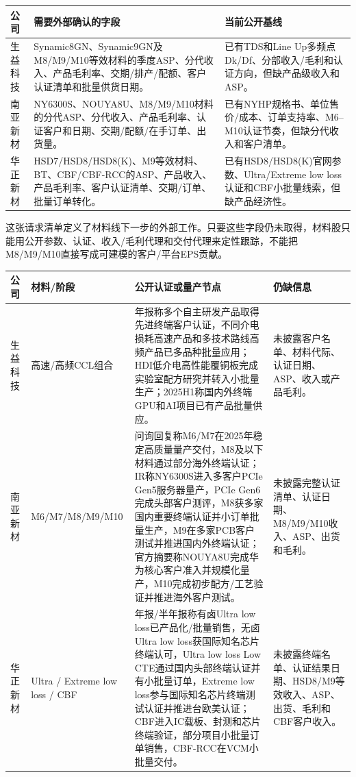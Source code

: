 \begin{exhibitbox}[图表3-16：材料线外部数据请求清单]
\scriptsize
\begin{tabularx}{\textwidth}{L{1.8cm}X X}
\toprule
\textbf{公司} & \textbf{需要外部确认的字段} & \textbf{当前公开基线} \\
\midrule
生益科技 & Synamic8GN、Synamic9GN及M8/M9/M10等效材料的季度ASP、分代收入、产品毛利率、交期/排产/配额、客户认证清单和批量供货日期。 & 已有TDS和Line Up多频点Dk/Df、分部收入/毛利和认证方向，但缺产品级收入和ASP。 \\
南亚新材 & NY6300S、NOUYA8U、M8/M9/M10材料的分代ASP、分代收入、产品毛利率、认证客户和日期、交期/配额/在手订单、出货量。 & 已有NYHP规格书、单位售价/成本、订单支持率、M6--M10认证节奏，但缺分代收入和客户清单。 \\
华正新材 & HSD7/HSD8/HSD8(K)、M9等效材料、BT、CBF/CBF-RCC的ASP、产品收入、产品毛利率、客户认证清单、交期/订单、批量订单转化。 & 已有HSD8/HSD8(K)官网参数、Ultra/Extreme low loss认证和CBF小批量线索，但缺产品经济性。 \\
\bottomrule
\end{tabularx}
\end{exhibitbox}

这张请求清单定义了材料线下一步的外部工作。只要这些字段仍未取得，材料股只能用公开参数、认证、收入/毛利代理和交付代理来定性跟踪，不能把M8/M9/M10直接写成可建模的客户/平台EPS贡献。

\begin{exhibitbox}[图表3-17：材料客户认证时间线]
\scriptsize
\begin{tabularx}{\textwidth}{L{1.7cm}L{2.0cm}X X}
\toprule
\textbf{公司} & \textbf{材料/阶段} & \textbf{公开认证或量产节点} & \textbf{仍缺信息} \\
\midrule
生益科技 & 高速/高频CCL组合 & 年报称多个自主研发产品取得先进终端客户认证，不同介电损耗高速产品和多技术路线高频产品已多品种批量应用；HDI低介电高性能覆铜板完成实验室配方研究并转入小批量生产；2025H1称国内外终端GPU和AI项目已有产品批量供应。 & 未披露客户名单、材料代际、认证日期、ASP、收入或产品毛利。 \\
南亚新材 & M6/M7/M8/M9/M10 & 问询回复称M6/M7在2025年稳定高质量量产交付，M8及以下材料通过部分海外终端认证；IR称NY6300S进入多客户PCIe Gen5服务器量产，PCIe Gen6完成头部客户测评，M8获多家国内重要终端认证并小订单批量生产，M9在多家PCB客户测试并推进国内外终端认证；官方摘要称NOUYA8U完成华为核心客户准入并规模化量产，M10完成初步配方/工艺验证并推进海外客户测试。 & 未披露完整认证清单、认证日期、M8/M9/M10收入、ASP、出货和毛利。 \\
华正新材 & Ultra / Extreme low loss / CBF & 年报/半年报称有卤Ultra low loss已产品化/批量销售，无卤Ultra low loss获国际知名芯片终端认可，Ultra low loss Low CTE通过国内头部终端认证并有小批量订单，Extreme low loss参与国际知名芯片终端测试认证并推进台欧美认证；CBF进入IC载板、封测和芯片终端验证，部分项目小批量订单销售，CBF-RCC在VCM小批量交付。 & 未披露终端名单、认证结果日期、HSD8/M9等效收入、ASP、出货、毛利和CBF客户收入。 \\
\bottomrule
\end{tabularx}
\end{exhibitbox}

